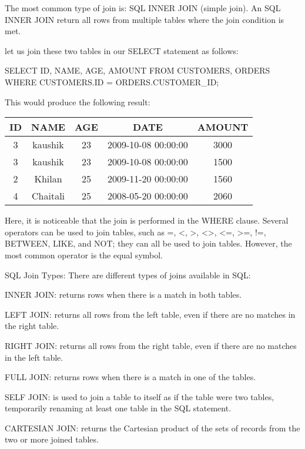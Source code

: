 The most common type of join is: SQL INNER JOIN (simple join). An SQL INNER JOIN return all rows from multiple tables where the join condition is met.

 let us join these two tables in our SELECT statement as follows:
 
 \begin{Code}
 	SELECT ID, NAME, AGE, AMOUNT
 	FROM CUSTOMERS, ORDERS
 	WHERE  CUSTOMERS.ID = ORDERS.CUSTOMER_ID;
 \end{Code}
 	
 This would produce the following result:
 
 \begin{center}
 	\begin{tabular}{|c|c|c|c|c|}
 		\hline
 		{\textbf{ID}} & {\textbf{NAME}} & {\textbf{AGE}} & {\textbf{DATE}} & {\textbf{AMOUNT}} \\
 		\hline
 		3 & kaushik		& 23 	&	2009-10-08 00:00:00 & 	3000 \\
 		3 & kaushik		& 23	& 	2009-10-08 00:00:00	&	1500 \\
 		2 & Khilan		& 25	& 	2009-11-20 00:00:00 &	1560 \\
 		4 & Chaitali	& 25	& 	2008-05-20 00:00:00 &	2060 \\
 		\hline
 	\end{tabular}
\end{center}

Here, it is noticeable that the join is performed in the WHERE clause. Several operators can be used to join tables, such as =, <, >, <>, <=, >=, !=, BETWEEN, LIKE, and NOT; they 
can all be used to join tables. However, the most common operator is the equal symbol.

SQL Join Types:
There are different types of joins available in SQL:

INNER JOIN: returns rows when there is a match in both tables.

LEFT JOIN: returns all rows from the left table, even if there are no matches in the right table.

RIGHT JOIN: returns all rows from the right table, even if there are no matches in the left table.

FULL JOIN: returns rows when there is a match in one of the tables.

SELF JOIN: is used to join a table to itself as if the table were two tables, temporarily renaming at least one table in the SQL statement.

CARTESIAN JOIN: returns the Cartesian product of the sets of records from the two or more joined tables.

